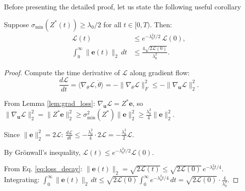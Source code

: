 \documentclass[twoside]{article}
\newcommand{\Lc}{\mathcal{L}}
\newcommand{\ehat}{\mathbf{e}}
\newcommand{\sigmamin}{\sigma_{\min}}
\begin{document}
Before presenting the detailed proof, let us state the following useful corollary
\begin{corollary}\label{cor:exp_decay}
Suppose $\sigmamin(Z^*(t)) \geq \lambda_0/2$ for all $t \in [0,T)$.  Then:
\begin{align}
  \Lc(t) &\leq e^{-\lambda_0^2 t/2}\,\Lc(0), \label{eq:loss_decay}\\
  \int_0^\infty\|\ehat(t)\|_2\,dt &\leq \frac{4\sqrt{2\Lc(0)}}{\lambda_0^2}. \label{eq:error_integral}
\end{align}
\end{corollary}
\begin{proof}
Compute the time derivative of $\mathcal{L}$ along gradient flow:
$$\frac{d\mathcal{L}}{dt} = \langle\nabla_\theta\mathcal{L}, \dot\theta\rangle = -\|\nabla_\theta\mathcal{L}\|_F^2
\leq -\|\nabla_\mathbf{u}\mathcal{L}\|_2^2.$$

From Lemma \ref{lem:grad_loss}: $\nabla_\mathbf{u}\mathcal{L} = Z^*\mathbf{e}$, so
$\|\nabla_\mathbf{u}\mathcal{L}\|_2^2 = \|Z^*\mathbf{e}\|_2^2 \geq \sigma_{\min}^2(Z^*)\|\mathbf{e}\|_2^2 \geq \frac{\lambda_0^2}{4}\|\mathbf{e}\|_2^2.$

Since $\|\mathbf{e}\|_2^2 = 2\mathcal{L}$:
$\frac{d\mathcal{L}}{dt} \leq -\frac{\lambda_0^2}{4} \cdot 2\mathcal{L} = -\frac{\lambda_0^2}{2}\mathcal{L}.$

By Grönwall's inequality, $\mathcal{L}(t) \leq e^{-\lambda_0^2 t/2}\mathcal{L}(0)$.

From Eq. \ref{eq:loss_decay}: $\|\mathbf{e}(t)\|_2 = \sqrt{2\mathcal{L}(t)} \leq \sqrt{2\mathcal{L}(0)}\,e^{-\lambda_0^2 t/4}$.
Integrating:
$\int_0^\infty\|\mathbf{e}(t)\|_2\,dt \leq \sqrt{2\mathcal{L}(0)}\int_0^\infty e^{-\lambda_0^2 t/4}\,dt
= \sqrt{2\mathcal{L}(0)} \cdot \frac{4}{\lambda_0^2}.$
\end{proof}



\end{document}
